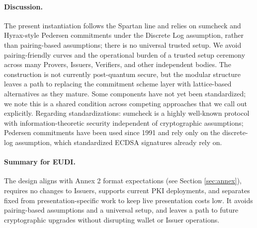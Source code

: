 \paragraph{Discussion.}
The present instantiation follows the Spartan line and relies on sumcheck and Hyrax-style Pedersen commitments under the Discrete Log assumption, rather than pairing-based assumptions; there is no universal trusted setup. 
We avoid pairing-friendly curves and the operational burden of a trusted setup ceremony across many Provers, Issuers, Verifiers, and other independent bodies. 
The construction is not currently post-quantum secure, but the modular structure leaves a path to replacing the commitment scheme layer with lattice-based alternatives as they mature. 
Some components have not yet been standardized; we note this is a shared condition across competing approaches that we call out explicitly.
Regarding standardizations: sumcheck is a highly well-known protocol with information-theoretic security independent of cryptographic assumptions; 
Pedersen commitments have been used since 1991 \cite{C:Pedersen91} and rely only on the discrete-log assumption, which standardized ECDSA signatures already rely on. 

\paragraph{Summary for EUDI.}
The design aligns with Annex 2 format expectations (see Section \ref{sec:annex}), requires no changes to Issuers, supports current PKI deployments, and separates fixed from presentation-specific work to keep live presentation costs low. 
It avoids pairing-based assumptions and a universal setup, and leaves a path to future cryptographic upgrades without disrupting wallet or Issuer operations.

